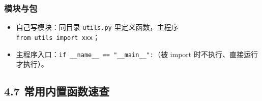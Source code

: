 \subsubsection{模块与包}\label{ux6a21ux5757ux4e0eux5305}

\begin{Shaded}
\begin{Highlighting}[]

\NormalTok{))}
\end{Highlighting}
\end{Shaded}

\begin{itemize}
\tightlist
\item
  自己写模块：同目录 \texttt{utils.py} 里定义函数，主程序
  \texttt{from\ utils\ import\ xxx}；
\item
  主程序入口：\texttt{if\ \_\_name\_\_\ ==\ "\_\_main\_\_":}（被 import
  时不执行、直接运行才执行）。
\end{itemize}

\subsection{4.7
常用内置函数速查}\label{ux5e38ux7528ux5185ux7f6eux51fdux6570ux901fux67e5}

